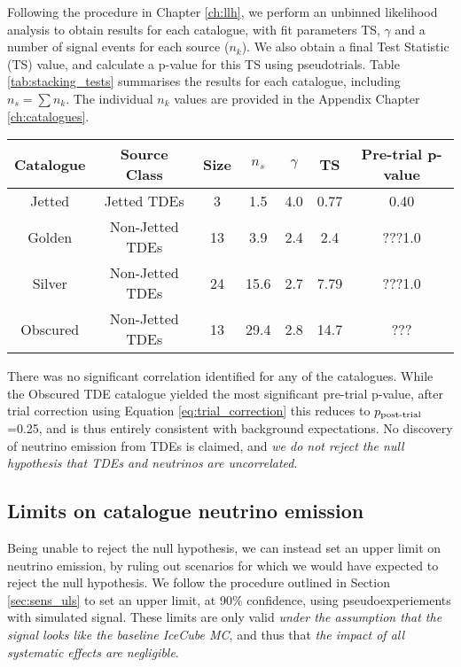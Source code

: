 Following the procedure in Chapter \ref{ch:llh}, we perform an unbinned likelihood analysis to obtain results for each catalogue, with fit parameters TS, $\gamma$ and a number of signal events for each source ($n_{k}$). We also obtain a final Test Statistic (TS) value, and calculate a p-value for this TS using pseudotrials. Table \ref{tab:stacking_tests} summarises the results for each catalogue, including $n_{s} = \sum n_{k}$. The individual $n_{k}$ values are provided in the Appendix Chapter \ref{ch:catalogues}.

\begin{table*}[]
	\centering
	\begin{tabular}{||c c c| c c c | c||} 
		\hline
		Catalogue & Source Class & Size & $n_{s}$  & $\gamma$ & TS & Pre-trial p-value\\ [0.5ex] 
		\hline\hline
		Jetted & Jetted TDEs &  3 & 1.5& 4.0&0.77&0.40\\ 
		\hline
		Golden & Non-Jetted TDEs & 13 &3.9&2.4& 2.4&???1.0\\
		\hline
		Silver & Non-Jetted TDEs & 24 &15.6&2.7&7.79& ???1.0\\
		\hline
		Obscured & Non-Jetted TDEs & 13 &29.4&2.8&14.7&???\\[1ex] 
		\hline
	\end{tabular}
	\caption{Summary of the results for the four TDE catalogues. For each, an independent stacking analysis was performed. The catalogues covered sources from May 2008 to October 2017, matching the IceCube data-taking period.}
	\label{tab:stacking_tests}
\end{table*}{}

There was no significant correlation identified for any of the catalogues. While the Obscured TDE catalogue yielded the most significant pre-trial p-value, after trial correction using Equation \ref{eq:trial_correction} this reduces to $p_{\textup{post-trial}}$=0.25, and is thus entirely consistent with background expectations. No discovery of neutrino emission from TDEs is claimed, and \emph{we do not reject the null hypothesis that TDEs and neutrinos are uncorrelated}.

\subsection{Limits on catalogue neutrino emission}

Being unable to reject the null hypothesis, we can instead set an upper limit on neutrino emission, by ruling out scenarios for which we would have expected to reject the null hypothesis. We follow the procedure outlined in Section \ref{sec:sens_uls} to set an upper limit, at 90\% confidence, using pseudoexperiements with simulated signal. These limits are only valid \emph{under the assumption that the signal looks like the baseline IceCube MC}, and thus that \emph{the impact of all systematic effects are negligible}.

